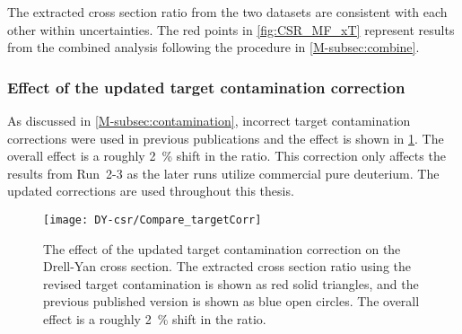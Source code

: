\documentclass[../main.tex]{subfiles}
\begin{document}
The extracted cross section ratio from the two datasets are consistent with each other within uncertainties.
The red points in \cref{fig:CSR_MF_xT} represent results from the combined analysis following the procedure in \cref{M-subsec:combine}.
\FloatBarrier

\subsubsection{Effect of the updated target contamination correction}
\label{subsubsec:contamination_result}
As discussed in \cref{M-subsec:contamination}, incorrect target contamination corrections were used
in previous publications and the effect is shown in \cref{fig:contaimination_CSR}.
The overall effect is a roughly \SI{2}{\percent} shift in the ratio. 
This correction only affects the results from Run~2-3 as the later runs utilize commercial pure deuterium.
The updated corrections are used throughout this thesis.
\begin{figure}[h!]
	\centering
	\texttt{[image: DY-csr/Compare\_targetCorr]}
	\caption{The effect of the updated target contamination correction on the Drell-Yan
		cross section. The extracted cross section ratio using the revised target contamination
		is shown as red solid triangles, and the previous published version is shown as blue open
		circles. The overall effect is a roughly \SI{2}{\percent} shift in the ratio. }
	\label{fig:contaimination_CSR}
\end{figure}
\FloatBarrier
\end{document}
